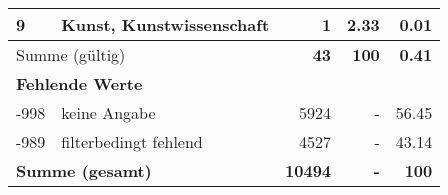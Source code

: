 \begin{longtable}{lXrrr}
     9 &
     \multicolumn{1}{X}{ Kunst, Kunstwissenschaft   } &


       \num{1} &
       \num[round-mode=places,round-precision=2]{2,33} &
         \num[round-mode=places,round-precision=2]{0,01} \\
     \midrule
     \multicolumn{2}{l}{Summe (gültig)} &
       \textbf{\num{43}} &
     \textbf{100} &
       \textbf{\num[round-mode=places,round-precision=2]{0,41}} \\
     \multicolumn{5}{l}{\textbf{Fehlende Werte}}\\
       -998 &
       keine Angabe &
         \num{5924} &
        - &
         \num[round-mode=places,round-precision=2]{56,45} \\
       -989 &
       filterbedingt fehlend &
         \num{4527} &
        - &
         \num[round-mode=places,round-precision=2]{43,14} \\
     \midrule
     \multicolumn{2}{l}{\textbf{Summe (gesamt)}} &
          \textbf{\num{10494}} &
        \textbf{-} &
        \textbf{100} \\
     \bottomrule
     \end{longtable}
     
